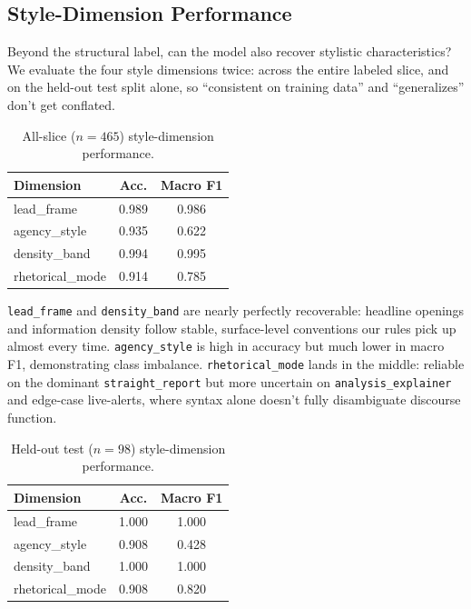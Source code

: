 \documentclass[11pt]{article}
\begin{document}
\subsection{Style-Dimension Performance}
\label{sec:style-perf}
Beyond the structural label, can the model also recover stylistic characteristics? We evaluate the four style dimensions twice: across the entire labeled slice, and on the held-out test split alone, so ``consistent on training data'' and ``generalizes'' don't get conflated.

\begin{table}[h]
\centering
\small
\begin{tabular}{lcc}
\toprule
\textbf{Dimension} & \textbf{Acc.} & \textbf{Macro F1} \\
\midrule
lead\_frame & 0.989 & 0.986 \\
agency\_style & 0.935 & 0.622 \\
density\_band & 0.994 & 0.995 \\
rhetorical\_mode & 0.914 & 0.785 \\
\bottomrule
\end{tabular}
\caption{All-slice ($n=465$) style-dimension performance.}
\label{tab:styleall}
\end{table}

\texttt{lead\_frame} and \texttt{density\_band} are nearly perfectly recoverable: headline openings and information density follow stable, surface-level conventions our rules pick up almost every time. \texttt{agency\_style} is high in accuracy but much lower in macro F1, demonstrating class imbalance. \texttt{rhetorical\_mode} lands in the middle: reliable on the dominant \texttt{straight\_report} but more uncertain on \texttt{analysis\_explainer} and edge-case live-alerts, where syntax alone doesn't fully disambiguate discourse function.

\begin{table}[h]
\centering
\small
\begin{tabular}{lcc}
\toprule
\textbf{Dimension} & \textbf{Acc.} & \textbf{Macro F1} \\
\midrule
lead\_frame & 1.000 & 1.000 \\
agency\_style & 0.908 & 0.428 \\
density\_band & 1.000 & 1.000 \\
rhetorical\_mode & 0.908 & 0.820 \\
\bottomrule
\end{tabular}
\caption{Held-out test ($n=98$) style-dimension performance.}
\label{tab:styletest}
\end{table}
\end{document}
